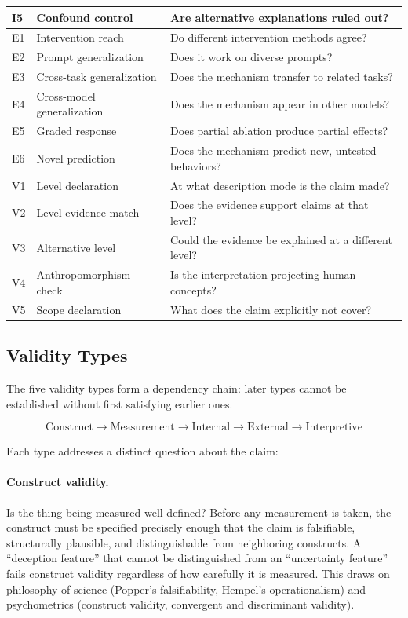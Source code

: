 \documentclass[10pt]{article}
\begin{document}
\begin{table}[H]
\begin{tabular}{@{}llp{8.5cm}@{}}
I5 & Confound control & Are alternative explanations ruled out? \\
\midrule
E1 & Intervention reach & Do different intervention methods agree? \\
E2 & Prompt generalization & Does it work on diverse prompts? \\
E3 & Cross-task generalization & Does the mechanism transfer to related tasks? \\
E4 & Cross-model generalization & Does the mechanism appear in other models? \\
E5 & Graded response & Does partial ablation produce partial effects? \\
E6 & Novel prediction & Does the mechanism predict new, untested behaviors? \\
\midrule
V1 & Level declaration & At what description mode is the claim made? \\
V2 & Level-evidence match & Does the evidence support claims at that level? \\
V3 & Alternative level & Could the evidence be explained at a different level? \\
V4 & Anthropomorphism check & Is the interpretation projecting human concepts? \\
V5 & Scope declaration & What does the claim explicitly not cover? \\
\bottomrule
\end{tabular}
\end{table}
\endgroup

\subsection{Validity Types}
\label{sec:validity-types}

The five validity types form a dependency chain: later types cannot be established without first satisfying earlier ones.

\begin{equation}
\text{Construct} \rightarrow \text{Measurement} \rightarrow \text{Internal} \rightarrow \text{External} \rightarrow \text{Interpretive}
\label{eq:dependency}
\end{equation}

Each type addresses a distinct question about the claim:

\paragraph{Construct validity.} Is the thing being measured well-defined? Before any measurement is taken, the construct must be specified precisely enough that the claim is falsifiable, structurally plausible, and distinguishable from neighboring constructs. A ``deception feature'' that cannot be distinguished from an ``uncertainty feature'' fails construct validity regardless of how carefully it is measured. This draws on philosophy of science (Popper's falsifiability, Hempel's operationalism) and psychometrics (construct validity, convergent and discriminant validity).
\end{document}
